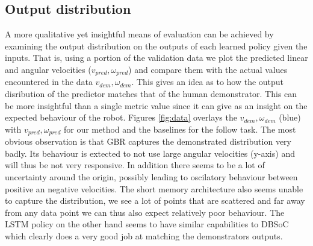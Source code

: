 \documentclass[letterpaper, 10 pt, conference]{ieeeconf}
\begin{document}
\subsection{Output distribution}
A more qualitative yet insightful means of evaluation can be achieved by examining the output distribution on the outputs of each learned policy given the inputs. That is, using a portion of the validation data we plot the predicted linear and angular velocities ($v_{pred},\omega_{pred}$) and compare them with the actual values encountered in the data $v_{dem},\omega_{dem}$. This gives an idea as to how the output disribution of the predictor matches that of the human demonstrator. This can be more insightful than a single metric value since it can give as an insight on the expected behaviour of the robot. Figures \ref{fig:data} overlays the $v_{dem},\omega_{dem}$ (blue) with $v_{pred},\omega_{pred}$ for our method and the baselines for the follow task. The most obvious observation is that GBR captures the demonstrated distribution very badly. Its behaviour is extected to not use large angular velocities (y-axis) and will thus be not very responsive. In addition there seems to be a lot of uncertainty around the origin, possibly leading to oscilatory behaviour between positive an negative velocities. The short memory architecture also seems unable to capture the distribution, we see a lot of points that are scattered and far away from any data point we can thus also expect relatively poor behaviour. The LSTM policy on the other hand seems to have similar capabilities to DBSoC which clearly does a very good job at matching the demonstrators outputs. 
\end{document}
